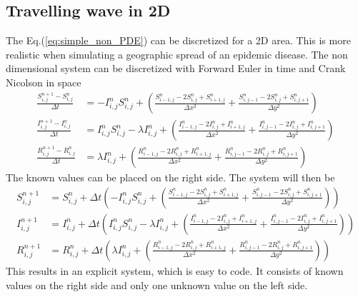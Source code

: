\documentclass[%
twoside,                 %
final,                   %
10pt]{article}
\begin{document}
\subsection{Travelling wave in 2D}
The Eq.(\ref{eq:simple_non_PDE}) can be discretized for a 2D area. This is more realistic when simulating a geographic spread of an epidemic disease. The non dimensional system  can be discretized with Forward Euler in time and Crank Nicolson in space
\begin{equation} \label{eq:SIR_disc}
	\begin{aligned}
    \frac{S^{n+1}_{i,j}-S^n_{i,j}}{\Delta t} &= -I^{n}_{i,j}S^{n}_{i,j} + \left(\frac{S^{n}_{i-1,j}-2S^{n}_{i,j}+S^{n}_{i+1,j}}{\Delta x^2}+\frac{S^{n}_{i,j-1}-2S^{n}_{i,j}+S^{n}_{i,j+1}}{\Delta y^2}\right) \\
    \frac{I^{n+1}_{i,j}-I^n_{i,j}}{\Delta t} &= I^{n}_{i,j}S^{n}_{i,j} -\lambda I^{n}_{i,j} + \left(\frac{I^{n}_{i-1,j}-2I^{n}_{i,j}+I^{n}_{i+1,j}}{\Delta x^2}+\frac{I^{n}_{i,j-1}-2I^{n}_{i,j}+I^{n}_{i,j+1}}{\Delta y^2}\right) \\
    \frac{R^{n+1}_{i,j}-R^n_{i,j}}{\Delta t} &= \lambda I^{n}_{i,j}+\left(\frac{R^{n}_{i-1,j}-2R^{n}_{i,j}+R^{n}_{i+1,j}}{\Delta x^2}+\frac{R^{n}_{i,j-1}-2R^{n}_{i,j}+R^{n}_{i,j+1}}{\Delta y^2}\right) 
	\end{aligned}
\end{equation}
The known values can be placed on the right side. The system will then be
\begin{equation}
	\begin{aligned}
    S^{n+1}_{i,j} &= S^{n}_{i,j}+\Delta t\left(-I^{n}_{i,j}S^{n}_{i,j} + \left(\frac{S^{n}_{i-1,j}-2S^{n}_{i,j}+S^{n}_{i+1,j}}{\Delta x^2}+\frac{S^{n}_{i,j-1}-2S^{n}_{i,j}+S^{n}_{i,j+1}}{\Delta y^2}\right)\right) \\
    I^{n+1}_{i,j} &= I^{n}_{i,j}+\Delta t\left(I^{n}_{i,j}S^{n}_{i,j} -\lambda I^{n}_{i,j} + \left(\frac{I^{n}_{i-1,j}-2I^{n}_{i,j}+I^{n}_{i+1,j}}{\Delta x^2}+\frac{I^{n}_{i,j-1}-2I^{n}_{i,j}+I^{n}_{i,j+1}}{\Delta y^2}\right)\right) \\
    R^{n+1}_{i,j} &= R^{n}_{i,j}+\Delta t\left(\lambda I^{n}_{i,j}+\left(\frac{R^{n}_{i-1,j}-2R^{n}_{i,j}+R^{n}_{i+1,j}}{\Delta x^2}+\frac{R^{n}_{i,j-1}-2R^{n}_{i,j}+R^{n}_{i,j+1}}{\Delta y^2}\right)\right) 
	\end{aligned}
\end{equation}
This results in an explicit system, which is easy to code. It consists of known values on the right side and only one unknown value on the left side.
\end{document}
